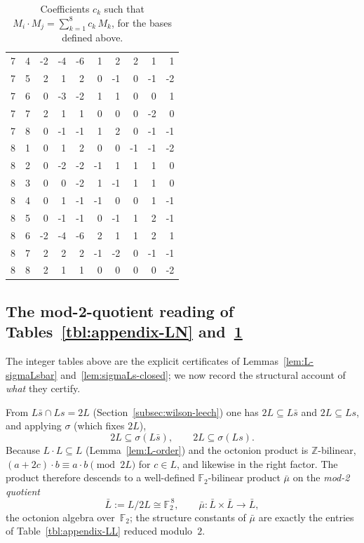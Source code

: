 \documentclass[twoside,english]{paper}
\numberwithin{equation}{section}
\numberwithin{figure}{section}
\theoremstyle{definition}
\theoremstyle{remark}
\newcommand{\ZZ}{\mathbb{Z}}
\newcommand{\FF}{\mathbb{F}}
\begin{document}
\begin{table}[H]
\begin{minipage}[t]{0.48\textwidth}
\begin{tabular}{cc|rrrrrrrr}
7 & 4 & -2 & -4 & -6 & 1 & 2 & 2 & 1 & 1 \\
7 & 5 & 2 & 1 & 2 & 0 & -1 & 0 & -1 & -2 \\
7 & 6 & 0 & -3 & -2 & 1 & 1 & 0 & 0 & 1 \\
7 & 7 & 2 & 1 & 1 & 0 & 0 & 0 & -2 & 0 \\
7 & 8 & 0 & -1 & -1 & 1 & 2 & 0 & -1 & -1 \\
\midrule
8 & 1 & 0 & 1 & 2 & 0 & 0 & -1 & -1 & -2 \\
8 & 2 & 0 & -2 & -2 & -1 & 1 & 1 & 1 & 0 \\
8 & 3 & 0 & 0 & -2 & 1 & -1 & 1 & 1 & 0 \\
8 & 4 & 0 & 1 & -1 & -1 & 0 & 0 & 1 & -1 \\
8 & 5 & 0 & -1 & -1 & 0 & -1 & 1 & 2 & -1 \\
8 & 6 & -2 & -4 & -6 & 2 & 1 & 1 & 2 & 1 \\
8 & 7 & 2 & 2 & 2 & -1 & -2 & 0 & -1 & -1 \\
8 & 8 & 2 & 1 & 1 & 0 & 0 & 0 & 0 & -2 \\
\bottomrule
\end{tabular}
\end{minipage}
\caption{Coefficients $c_k$ such that $M_i \cdot M_j = \sum_{k=1}^{8} c_k\, M_k$, for the bases defined above.}\label{tbl:appendix-MM}
\end{table}

\subsection{The mod-2-quotient reading of Tables~\ref{tbl:appendix-LN}
and~\ref{tbl:appendix-MM}}\label{app:mod2quotient}

The integer tables above are the explicit certificates of
Lemmas~\ref{lem:L-sigmaLsbar} and~\ref{lem:sigmaLs-closed}; we now
record the structural account of \emph{what} they certify.

From $L\bar s \cap Ls = 2L$ (Section~\ref{subsec:wilson-leech}) one
has $2L \subseteq L\bar s$ and $2L \subseteq Ls$, and applying
$\sigma$ (which fixes $2L$),
\[
  2L \subseteq \sigma(L\bar s), \qquad 2L \subseteq \sigma(Ls).
\]
Because $L \cdot L \subseteq L$ (Lemma~\ref{lem:L-order}) and the
octonion product is $\ZZ$-bilinear, $(a + 2c) \cdot b \equiv a \cdot
b \pmod{2L}$ for $c \in L$, and likewise in the right factor.  The
product therefore descends to a well-defined $\FF_2$-bilinear product
$\bar\mu$ on the \emph{mod-2 quotient}
\[
  \bar L := L/2L \cong \FF_2^{\,8}, \qquad
  \bar\mu \colon \bar L \times \bar L \to \bar L,
\]
the octonion algebra over~$\FF_2$; the structure constants of
$\bar\mu$ are exactly the entries of Table~\ref{tbl:appendix-LL}
reduced modulo~$2$.
\end{document}
